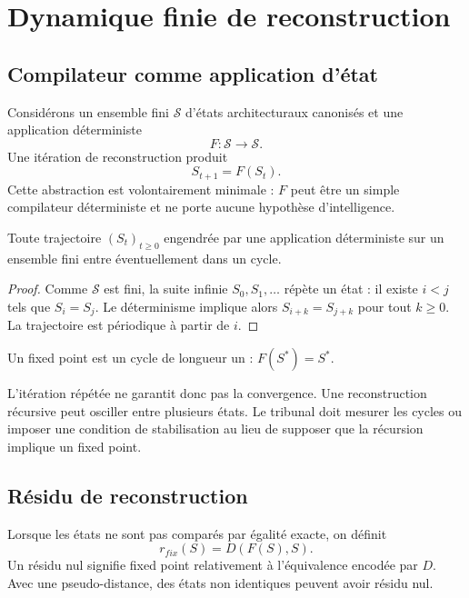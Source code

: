 \chapter{Dynamique finie de reconstruction}

\section{Compilateur comme application d'état}

Considérons un ensemble fini $\mathcal S$ d'états architecturaux canonisés et une application déterministe
\[
F:\mathcal S\to\mathcal S.
\]
Une itération de reconstruction produit
\[
S_{t+1}=F(S_t).
\]
Cette abstraction est volontairement minimale : $F$ peut être un simple compilateur déterministe et ne porte aucune hypothèse d'intelligence.

\begin{proposition}
Toute trajectoire $(S_t)_{t\geq0}$ engendrée par une application déterministe sur un ensemble fini entre éventuellement dans un cycle.
\end{proposition}

\begin{proof}
Comme $\mathcal S$ est fini, la suite infinie $S_0,S_1,\ldots$ répète un état : il existe $i<j$ tels que $S_i=S_j$. Le déterminisme implique alors $S_{i+k}=S_{j+k}$ pour tout $k\geq0$. La trajectoire est périodique à partir de $i$.
\end{proof}

\begin{corollary}
Un fixed point est un cycle de longueur un : $F(S^*)=S^*$.
\end{corollary}

\begin{observation}
L'itération répétée ne garantit donc pas la convergence. Une reconstruction récursive peut osciller entre plusieurs états. Le tribunal doit mesurer les cycles ou imposer une condition de stabilisation au lieu de supposer que la récursion implique un fixed point.
\end{observation}

\section{Résidu de reconstruction}

Lorsque les états ne sont pas comparés par égalité exacte, on définit
\[
r_{fix}(S)=D(F(S),S).
\]
Un résidu nul signifie fixed point relativement à l'équivalence encodée par $D$. Avec une pseudo-distance, des états non identiques peuvent avoir résidu nul.


